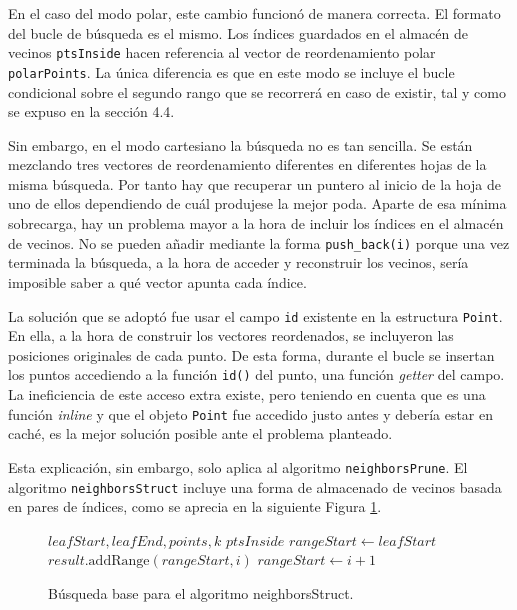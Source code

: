 En el caso del modo polar, este cambio funcionó de manera correcta. El formato del bucle de búsqueda es el mismo. Los índices guardados en el almacén de vecinos \texttt{ptsInside} hacen referencia al vector de reordenamiento polar \texttt{polarPoints}. La única diferencia es que en este modo se incluye el bucle condicional sobre el segundo rango que se recorrerá en caso de existir, tal y como se expuso en la sección 4.4.

Sin embargo, en el modo cartesiano la búsqueda no es tan sencilla. Se están mezclando tres vectores de reordenamiento diferentes en diferentes hojas de la misma búsqueda. Por tanto hay que recuperar un puntero al inicio de la hoja de uno de ellos dependiendo de cuál produjese la mejor poda. Aparte de esa mínima sobrecarga, hay un problema mayor a la hora de incluir los índices en el almacén de vecinos. No se pueden añadir mediante la forma \texttt{push\_back(i)} porque una vez terminada la búsqueda, a la hora de acceder y reconstruir los vecinos, sería imposible saber a qué vector apunta cada índice. 

La solución que se adoptó fue usar el campo \texttt{id} existente en la estructura \texttt{Point}. En ella, a la hora de construir los vectores reordenados, se incluyeron las posiciones originales de cada punto. De esta forma, durante el bucle se insertan los puntos accediendo a la función \texttt{id()} del punto, una función \textit{getter} del campo. La ineficiencia de este acceso extra existe, pero teniendo en cuenta que es una función \textit{inline} y que el objeto \texttt{Point} fue accedido justo antes y debería estar en caché, es la mejor solución posible ante el problema planteado.

Esta explicación, sin embargo, solo aplica al algoritmo \texttt{neighborsPrune}. El algoritmo \texttt{neighborsStruct} incluye una forma de almacenado de vecinos basada en pares de índices, como se aprecia en la siguiente Figura \ref{alg:struct}. 

\begin{figure}[H]
\centering
\begin{minipage}{0.82\textwidth}
\begin{algorithmic}[1]
\Require $\mathit{leafStart}, \mathit{leafEnd}, \mathit{points}, k$
\Ensure $\mathit{ptsInside}$
\Statex
\State $\mathit{rangeStart} \gets leafStart$
            \State $\mathit{result}.\text{addRange}(\mathit{rangeStart}, i)$
        \EndIf
        \State $\mathit{rangeStart} \gets i + 1$
    \EndIf
\EndFor
\end{algorithmic}
\caption{Búsqueda base para el algoritmo neighborsStruct.}
\label{alg:struct}
\end{minipage}
\end{figure}

